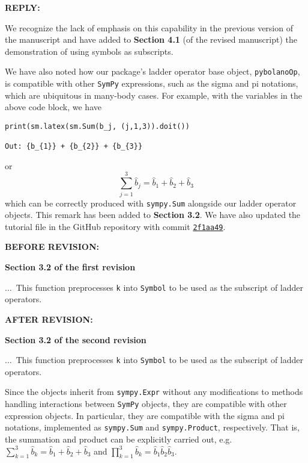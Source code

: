 \documentclass[12pt, a4paper]{article}
\newcommand{\inlinecode}[1]{\texttt{#1}}
\newcommand{\bop}{\hat{b}}
\newenvironment{revision}{%
\color{red}
}
{}
\newenvironment{reva}{%
\color{Black}
\par
\textbf{REPLY:}
\par
}
{\bigskip}
\newenvironment{revpre}{%
\textbf{{BEFORE REVISION:}}
\par
}
{\bigskip}
\newenvironment{revpost}{%
\textbf{{AFTER REVISION:}}
\par
}
{}
\begin{document}
\begin{reva}
We recognize the lack of emphasis on this capability in the previous version of the manuscript and have added to \textbf{Section 4.1} (of the revised manuscript) the demonstration of using symbols as subscripts.

We have also noted how our package's ladder operator base object, \inlinecode{pybolanoOp}, is compatible with other \texttt{SymPy} expressions, such as the sigma and pi notations, which are ubiquitous in many-body cases. For example, with the variables in the above code block, we have
\begin{verbatim}
print(sm.latex(sm.Sum(b_j, (j,1,3)).doit())

Out: {b_{1}} + {b_{2}} + {b_{3}}
\end{verbatim}
or 
\begin{equation}
    \sum_{j=1}^3 \bop_j = \bop_1+\bop_2+\bop_3
\end{equation}
which can be correctly produced with \texttt{sympy.Sum} alongside our ladder operator objects. This remark has been added to \textbf{Section 3.2}. We have also updated the tutorial file in the GitHub repository with commit \href{https://github.com/hendry24/pyBoLaNO/commit/2f1aa4914dca615bc4842bf2e86f8b4356e74445}{\texttt{2f1aa49}}.

\end{reva}

\begin{revpre}
\textbf{Section 3.2 of the first revision}

$\dots$~This function preprocesses \inlinecode{k} into \inlinecode{Symbol} to be used as the subscript of ladder operators. 
\end{revpre}

\begin{revpost}
\textbf{Section 3.2 of the second revision}

$\dots$~This function preprocesses \inlinecode{k} into \inlinecode{Symbol} to be used as the subscript of ladder operators. 

\begin{revision}
Since the objects inherit from \inlinecode{sympy.Expr} without any modifications to methods handling interactions between \texttt{SymPy} objects, they are compatible with other expression objects. In particular, they are compatible with the sigma and pi notations, implemented as \inlinecode{sympy.Sum} and \inlinecode{sympy.Product}, respectively. That is, the summation and product can be explicitly carried out, e.g. $\sum_{k=1}^3 \bop_k = \bop_1+\bop_2+\bop_3$ and $\prod_{k=1}^3 \bop_k = \bop_1\bop_2\bop_3$.
\end{revision}
\end{revpost}
\end{document}
